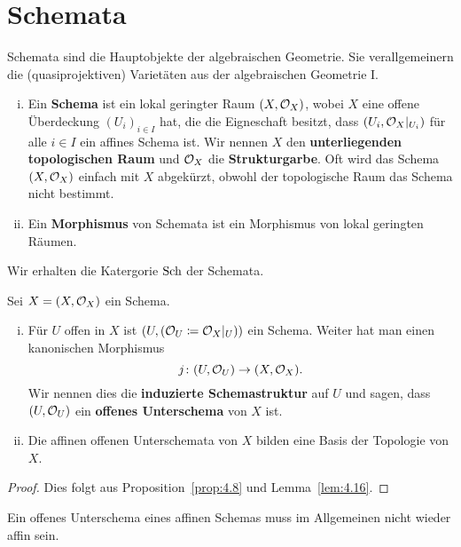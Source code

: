
\chapter{Schemata}

Schemata sind die Hauptobjekte der algebraischen Geometrie. Sie verallgemeinern die (quasiprojektiven) Varietäten aus der algebraischen Geometrie I.

\begin{defn}
\label{defn:5.1}
	\begin{enumerate}[i)]
		\item Ein \textbf{Schema} ist ein lokal geringter Raum $(X,\mathcal{O}_X)$, wobei $X$ eine offene Überdeckung $(U_i)_{i\in I}$ hat, die die Eigneschaft besitzt, dass $(U_i,\mathcal{O}_{X}\vert_{U_i})$ für alle $i \in I$ ein affines Schema ist. Wir nennen $X$ den \textbf{unterliegenden topologischen Raum} und $\mathcal{O}_X$ die \textbf{Strukturgarbe}. Oft wird das Schema $(X,\mathcal{O}_X)$ einfach mit $X$ abgekürzt, obwohl der topologische Raum das Schema nicht bestimmt.
		\item Ein \textbf{Morphismus} von Schemata ist ein Morphismus von lokal geringten Räumen.
	\end{enumerate}
	Wir erhalten die Katergorie $\operatorname{Sch}$ der Schemata.
\end{defn}

\begin{prop}
	Sei $X = (X,\mathcal{O}_X)$ ein Schema.
	\begin{enumerate}[i)]
		\item Für $U$ offen in $X$ ist $(U,(\mathcal{O}_U \coloneqq \mathcal{O}_X\vert_U))$ ein Schema. Weiter hat man einen kanonischen Morphismus
		\[
			j\colon (U,\mathcal{O}_U) \to (X,\mathcal{O}_X).
		\]
		Wir nennen dies die \textbf{induzierte Schemastruktur} auf $U$ und sagen, dass $(U,\mathcal{O}_U)$ ein \textbf{offenes Unterschema} von $X$ ist.
		\item Die affinen offenen Unterschemata von $X$ bilden eine Basis der Topologie von $X$.
	\end{enumerate}
	\begin{proof}
		Dies folgt aus Proposition~\ref{prop:4.8} und Lemma~\ref{lem:4.16}.
	\end{proof}
\end{prop}

\begin{bem}
	Ein offenes Unterschema eines affinen Schemas muss im Allgemeinen nicht wieder affin sein.
\end{bem}

